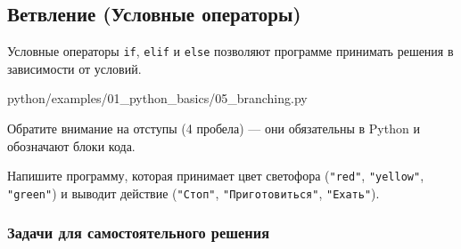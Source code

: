 \subsection{Ветвление (Условные операторы)}

Условные операторы \texttt{if}, \texttt{elif} и \texttt{else} позволяют программе принимать решения в зависимости от условий.

\begin{codefile}[python]{python/examples/01_python_basics/05_branching.py}
\end{codefile}

Обратите внимание на отступы (4 пробела) — они обязательны в Python и обозначают блоки кода.

\begin{taskbox}[Светофор]
Напишите программу, которая принимает цвет светофора (\texttt{"red"}, \texttt{"yellow"}, \texttt{"green"}) и выводит действие (\texttt{"Стоп"}, \texttt{"Приготовиться"}, \texttt{"Ехать"}).
\end{taskbox}

\subsubsection*{Задачи для самостоятельного решения}


